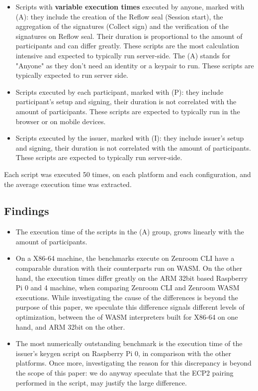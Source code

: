 \documentclass[twocolumn]{article}
\begin{document}
\begin{itemize}
\item Scripts with \textbf{variable execution times} executed by anyone, marked with (A): they include the creation of the Reflow seal (Session start), the aggregation of the signatures (Collect sign) and the verification of the signatures on Reflow seal. Their duration is proportional to the amount of participants and can differ greatly. These scripts are the most calculation intensive and expected to typically run server-side. The (A) stands for "Anyone" as they don't need an identity or a keypair to run. These scripts are typically expected to run server side.

\item Scripts executed by each participant, marked with (P): they include participant's setup and signing, their duration is not correlated with the amount of participants. These scripts are expected to typically run in the browser or on mobile devices.

\item Scripts executed by the issuer, marked with (I): they include issuer's setup and signing, their duration is not correlated with the amount of participants. These scripts are expected to typically run server-side.
\end{itemize}

Each script was executed 50 times, on each platform and each configuration, and the average execution time was extracted. 



\subsection*{Findings}

\begin{itemize}
\item The execution time of the scripts in the (A) group, grows linearly with the amount of participants. 

\item On a X86-64 machine, the benchmarks execute on Zenroom CLI have a comparable duration with their counterparts run on WASM. On the other hand, the execution times differ greatly on the ARM 32bit based Raspberry Pi 0 and 4 machine, when comparing Zenroom CLI and Zenroom WASM executions. 
While investigating the cause of the differences is beyond the purpose of this paper, we speculate this difference signals different levels of optimization, between the of WASM interpreters built for X86-64 on one hand, and ARM 32bit on the other.  

\item The most numerically outstanding benchmark is the execution time of the issuer's keygen script on Raspberry Pi 0, in comparison with the other platforms. Once more, investigating the reason for this discrepancy is beyond the scope of this paper: we do anyway speculate that the ECP2 pairing performed in the script, may justify the large difference.
\end{itemize}
\end{document}
